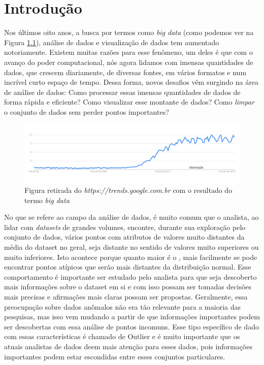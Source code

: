 \chapter{Introdução}

Nos últimos oito anos, a busca por termos como \textit{big data} (como podemos ver na Figura \ref{fig:google-trend}), análise de dados e visualização de dados tem aumentado notoriamente. Existem muitas razões para esse fenômeno, um deles é que com o avanço do poder computacional, nós agora lidamos com imensas quantidades de dados, que crescem diariamente, de diversas fontes, em vários formatos e num incrível curto espaço de tempo. Dessa forma, novos desafios vêm surgindo na área de análise de dados: Como processar essas imensas quantidades de dados de forma rápida e eficiente? Como visualizar esse montante de dados? Como \textit{limpar} o conjunto de dados sem perder pontos importantes?

\begin{figure}[!h]
	\centering
	\includegraphics[width=\textwidth]{images/google-trend-big-data.png}
	\caption{Figura retirada do \textit{https://trends.google.com.br} com o resultado do termo \textit{big data}}
	\label{fig:google-trend}
	\vspace{-10pt}
\end{figure}

No que se refere ao campo da análise de dados, é muito comum que o analista, ao lidar com \textit{datasets} de grandes volumes, encontre, durante sua exploração pelo conjunto de dados, vários pontos com atributos de valores muito distantes da média do dataset no geral, seja distante no sentido de valores muito superiores ou muito inferiores. Isto acontece porque quanto maior é o , mais facilmente se pode encontrar pontos atípicos que serão mais distantes da distribuição normal. Esse comportamento é importante ser estudado pelo analista para que seja descoberto mais informações sobre o dataset em si e com isso possam ser tomadas decisões mais precisas e afirmações mais claras possam ser propostas. Geralmente, essa preocupação sobre dados anômalos não era tão relevante para a maioria das pesquisas, mas isso vem mudando a partir de que informações importantes podem ser descobertas com essa análise de pontos incomuns. Esse tipo específico de dado com essas características é chamado de Outlier e é muito importante que os atuais analistas de dados deem mais atenção para esses dados, pois informações importantes podem estar escondidas entre esses conjuntos particulares.

